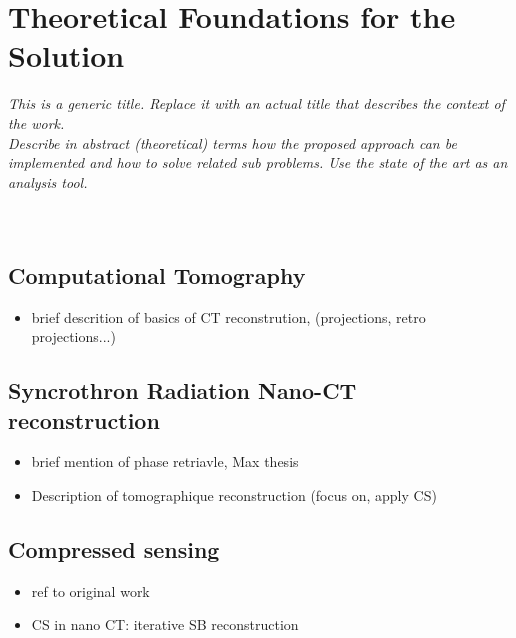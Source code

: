 \chapter{Theoretical Foundations for the Solution}
\textit{This is a generic title. Replace it with an actual title that describes the context of the work. \\
Describe in abstract (theoretical) terms how the proposed approach can be implemented and how to solve related sub problems.  Use the state of the art as an analysis tool. }\\
\\
\\
\section{Computational Tomography}
\begin{itemize}
	\item brief descrition of basics of CT reconstrution, (projections, retro projections...)
\end{itemize}

\section{Syncrothron Radiation Nano-CT reconstruction}
\begin{itemize}
	\item brief mention of phase retriavle, Max thesis
	\item Description of tomographique reconstruction (focus on, apply CS)
\end{itemize}

\section{Compressed sensing}
\begin{itemize}
	\item ref to original work
	\item CS in nano CT: iterative SB reconstruction
\end{itemize}